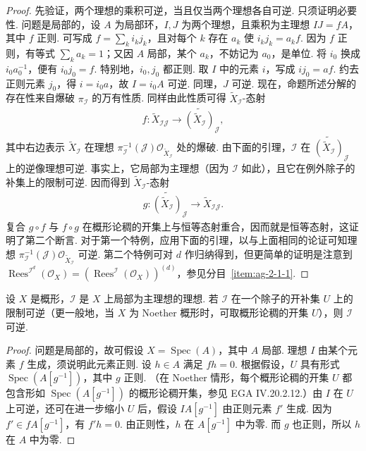 \begin{proof}
先验证，两个理想的乘积可逆，当且仅当两个理想各自可逆. 只须证明必要性. 问题是局部的，设 $A$ 为局部环，$I,J$ 为两个理想，且乘积为主理想 $IJ=fA$，其中 $f$ 正则. 可写成 $f=\sum_ki_kj_k$，且对每个 $k$ 存在 $a_k$ 使 $i_kj_k=a_kf$. 因为 $f$ 正则，有等式 $\sum_ka_k=1$；又因 $A$ 局部，某个 $a_k$，不妨记为 $a_0$，是单位. 将 $i_0$ 换成 $i_0a_0^{-1}$，便有 $i_0j_0=f$. 特别地，$i_0,j_0$ 都正则. 取 $I$ 中的元素 $i$，写成 $ij_0=af$. 约去正则元素 $j_0$，得 $i=i_0a$，故 $I=i_0A$ 可逆. 同理，$J$ 可逆.
现在，命题所述分解的存在性来自爆破 $\pi_{\mathcal I}$ 的万有性质. 同样由此性质可得 $\widetilde X_{\mathcal I}$-态射
\begin{align*}
f:\widetilde X_{\mathcal I\mathcal J}\longrightarrow\widetilde{(\widetilde X_{\mathcal I})}_{\mathcal J},
\end{align*}
其中右边表示 $\widetilde X_{\mathcal I}$ 在理想 $\pi_{\mathcal I}^{-1}(\mathcal J)\mathcal O_{\widetilde X_{\mathcal I}}$ 处的爆破. 由下面的引理，$\mathcal I$ 在 $\widetilde{(\widetilde X_{\mathcal I})}_{\mathcal J}$ 上的逆像理想可逆. 事实上，它局部为主理想（因为 $\mathcal I$ 如此），且它在例外除子的补集上的限制可逆. 因而得到 $\widetilde X_{\mathcal I}$-态射
\begin{align*}
g:\widetilde{(\widetilde X_{\mathcal I})}_{\mathcal J}\longrightarrow\widetilde X_{\mathcal I\mathcal J}.
\end{align*}
复合 $g\circ f$ 与 $f\circ g$ 在概形论稠的开集上与恒等态射重合，因而就是恒等态射，这证明了第二个断言.
对于第一个特例，应用下面的引理，以与上面相同的论证可知理想 $\pi_{\mathcal I}^{-1}(\mathcal J)\mathcal O_{\widetilde X_{\mathcal I}}$ 可逆. 第二个特例可对 $d$ 作归纳得到，但更简单的证明是注意到 $\operatorname{Rees}^{\mathcal I^d}(\mathcal O_X)=(\operatorname{Rees}^{\mathcal I}(\mathcal O_X))^{(d)}$，参见分目~\ref{item:ag-2-1-1}.
\end{proof}
\begin{lemma*}
设 $X$ 是概形，$\mathcal I$ 是 $X$ 上局部为主理想的理想. 若 $\mathcal I$ 在一个除子的开补集 $U$ 上的限制可逆（更一般地，当 $X$ 为 Noether 概形时，可取概形论稠的开集 $U$），则 $\mathcal I$ 可逆.
\end{lemma*}
\begin{proof}
问题是局部的，故可假设 $X=\operatorname{Spec}(A)$，其中 $A$ 局部. 理想 $I$ 由某个元素 $f$ 生成，须说明此元素正则. 设 $h\in A$ 满足 $fh=0$. 根据假设，$U$ 具有形式 $\operatorname{Spec}(A[g^{-1}])$，其中 $g$ 正则. （在 Noether 情形，每个概形论稠的开集 $U$ 都包含形如 $\operatorname{Spec}(A[g^{-1}])$ 的概形论稠开集，参见 EGA IV.20.2.12.）由 $I$ 在 $U$ 上可逆，还可在进一步缩小 $U$ 后，假设 $IA[g^{-1}]$ 由正则元素 $f'$ 生成. 因为 $f'\in fA[g^{-1}]$，有 $f'h=0$. 由正则性，$h$ 在 $A[g^{-1}]$ 中为零. 而 $g$ 也正则，所以 $h$ 在 $A$ 中为零.
\end{proof}
